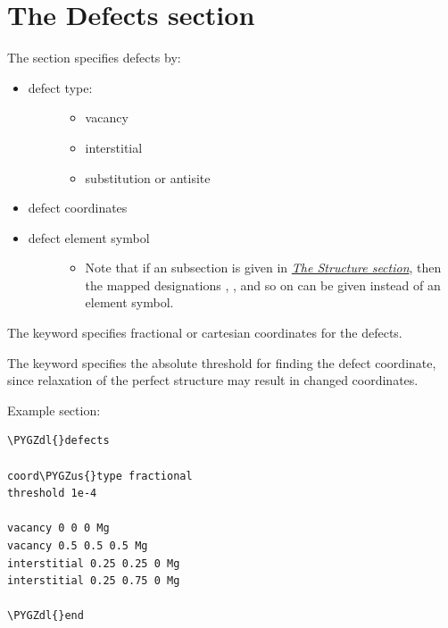 \documentclass[letterpaper,10pt,english]{sphinxmanual}
\def\PYGZus{\char`\_}
\def\PYGZdl{\char`\$}
\begin{document}
\section{The Defects section}
\label{3_1_5_defects::doc}\label{3_1_5_defects:the-defects-section}
The  section specifies defects by:
\begin{itemize}
\item {} \begin{description}
\item[{defect type:}] \leavevmode\begin{itemize}
\item {} 
vacancy

\item {} 
interstitial

\item {} 
substitution or antisite

\end{itemize}

\end{description}

\item {} 
defect coordinates

\item {} \begin{description}
\item[{defect element symbol}] \leavevmode\begin{itemize}
\item {} 
Note that if an  subsection is given in {\hyperref[3_1_1_structure::doc]{\emph{The Structure section}}}, then the mapped designations , , and so on can be given instead of an element symbol.

\end{itemize}

\end{description}

\end{itemize}

The  keyword specifies fractional or cartesian coordinates for the defects.

The  keyword specifies the absolute threshold for finding the defect coordinate, since relaxation of the perfect structure may result in changed coordinates.

Example  section:

\begin{Verbatim}[commandchars=\\\{\}]
\PYGZdl{}defects

coord\PYGZus{}type fractional
threshold 1e-4

vacancy 0 0 0 Mg
vacancy 0.5 0.5 0.5 Mg
interstitial 0.25 0.25 0 Mg
interstitial 0.25 0.75 0 Mg

\PYGZdl{}end
\end{Verbatim}
\end{document}
